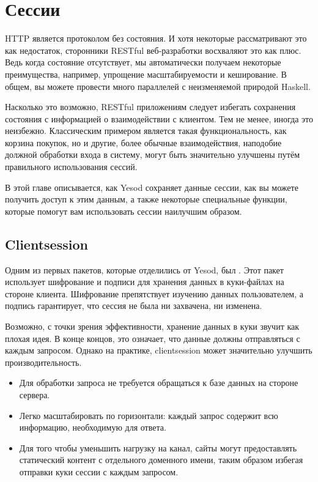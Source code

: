\chapter{Сессии}\label{chap:sessions}

HTTP является протоколом без состояния. И хотя некоторые рассматривают это как
недостаток, сторонники RESTful веб-разработки восхваляют это как плюс. Ведь
когда состояние отсутствует, мы автоматически получаем некоторые преимущества,
например, упрощение масштабируемости и кеширование.  В общем, вы можете
провести много параллелей с неизменяемой природой Haskell.

Насколько это возможно, RESTful приложениям следует избегать сохранения
состояния с информацией о взаимодействии с клиентом. Тем не менее, иногда это
неизбежно. Классическим примером является такая функциональность, как корзина
покупок, но и другие, более обычные взаимодействия, наподобие должной обработки
входа в систему, могут быть значительно улучшены путём правильного
использования сессий.

В этой главе описывается, как Yesod сохраняет данные сессии, как вы можете
получить доступ к этим данным, а также некоторые специальные функции, которые
помогут вам использовать сессии наилучшим образом.

\section{Clientsession}

Одним из первых пакетов, которые отделились от Yesod, был
.
Этот пакет использует шифрование и подписи для хранения данных в куки-файлах на
стороне клиента. Шифрование препятствует изучению данных пользователем, а
подпись гарантирует, что сессия не была ни захвачена, ни изменена.

Возможно, с точки зрения эффективности, хранение данных в куки звучит как
плохая идея. В конце концов, это означает, что данные должны отправляться с
каждым запросом. Однако на практике, clientsession может значительно улучшить
производительность.

\begin{itemize}
  \item Для обработки запроса не требуется обращаться к базе данных на стороне
      сервера.

  \item Легко масштабировать по горизонтали: каждый запрос содержит всю
      информацию, необходимую для ответа.

  \item Для того чтобы уменьшить нагрузку на канал, сайты могут предоставлять
      статический контент с отдельного доменного имени, таким образом избегая
      отправки куки сессии с каждым запросом.
\end{itemize}

